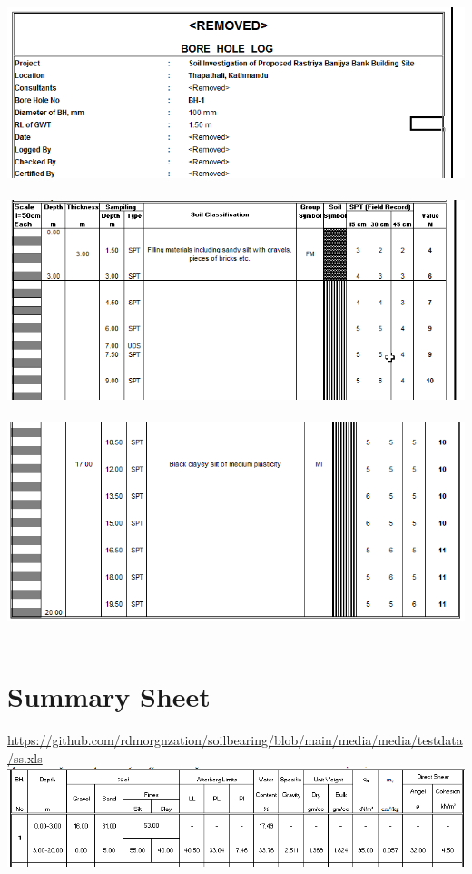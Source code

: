 \includegraphics[width=\linewidth,keepaspectratio]{./extras/1.png}\\\\
\includegraphics[width=\linewidth,keepaspectratio]{./extras/2.png}\\\\
\includegraphics[width=\linewidth,keepaspectratio]{./extras/3.png}\\\\

\section{Summary Sheet}
\url{https://github.com/rdmorgnzation/soilbearing/blob/main/media/media/testdata/ss.xls}\\

\includegraphics[width=\linewidth,keepaspectratio]{./extras/ss.png}\\\\

